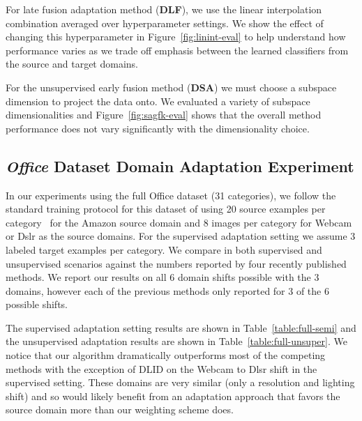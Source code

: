   For late fusion adaptation method (\textbf{DLF}), we use the linear interpolation combination averaged over hyperparameter settings. We show the effect of changing this hyperparameter in Figure~\ref{fig:linint-eval} to help understand how performance varies as we trade off emphasis between the learned classifiers from the source and target domains. 

  For the unsupervised early fusion method (\textbf{DSA}) we must choose a subspace dimension to project the data onto. We evaluated a variety of
  subspace dimensionalities and Figure~\ref{fig:sagfk-eval} shows that the overall method performance does not vary significantly with the dimensionality choice.

\subsection{\emph{Office} Dataset Domain Adaptation Experiment}
In our experiments using the full Office dataset (31 categories),
we follow the standard training protocol for this dataset of using 20 source
examples per category~\cite{saenko-eccv10,gong-cvpr12}
 for the Amazon source domain and 8 images per category for Webcam or
 Dslr as the source domains. For the supervised adaptation setting 
 we assume 3 labeled target examples per category.
We compare in both supervised and unsupervised scenarios against the numbers reported by four recently published methods.
We report our results on all 6 domain shifts possible with the 3 domains, however each of the previous methods only reported for  3 of the 6 possible shifts.

The supervised adaptation setting results are shown in Table~\ref{table:full-semi} and the unsupervised adaptation results are shown in Table~\ref{table:full-unsuper}. We notice that our algorithm dramatically outperforms most of the competing methods with the exception of DLID on the Webcam to Dlsr shift in the supervised setting. These domains are very similar (only a resolution and lighting shift) and so would likely benefit from an adaptation approach that favors the source domain more than our weighting scheme does. 

